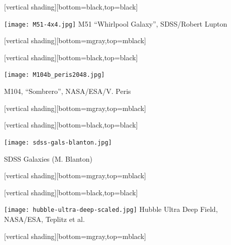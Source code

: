 \documentclass{beamer}
\begin{document}
{
    [vertical shading][bottom=black,top=black]

    \frame
    {	

        \begin{center}
            \texttt{[image: M51-4x4.jpg]}
            \newline
            \hfill {\tiny M51 ``Whirlpool Galaxy'', SDSS/Robert Lupton}
        \end{center}

    }
    [vertical shading][bottom=mgray,top=mblack]
}

{
    [vertical shading][bottom=black,top=black]

    \frame
    {	

        \begin{center}

        \centerline{\texttt{[image: M104b\_peris2048.jpg]}}
            \hfill {\tiny M104, ``Sombrero'', NASA/ESA/V. Peris}
        \end{center}
    }
    [vertical shading][bottom=mgray,top=mblack]
}




{
    [vertical shading][bottom=black,top=black]


    \frame
    {
        \begin{center}
             \texttt{[image: sdss-gals-blanton.jpg]}
         \end{center}
        {\tiny \hfill SDSS Galaxies (M. Blanton)}
    }
    [vertical shading][bottom=mgray,top=mblack]

}


{
    [vertical shading][bottom=black,top=black]

    \frame
    {


        \begin{center}
            \texttt{[image: hubble-ultra-deep-scaled.jpg]}
            \newline
            {\tiny  Hubble Ultra Deep Field, NASA/ESA, Teplitz et al.}
        \end{center}

    }

    [vertical shading][bottom=mgray,top=mblack]
}
\end{document}
